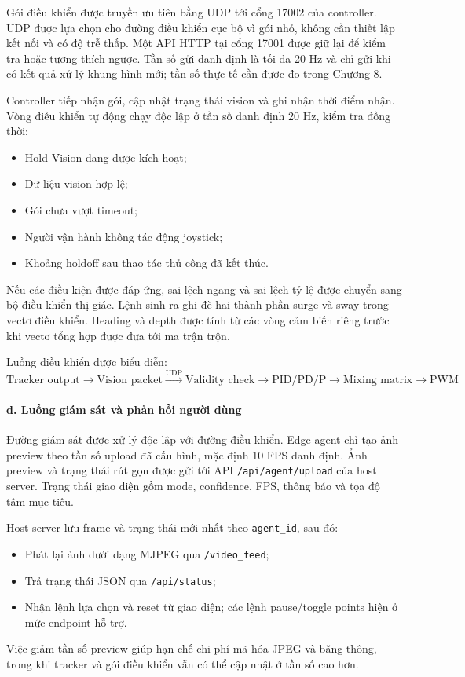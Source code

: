 \documentclass[../DoAn.tex]{subfiles}
\begin{document}
Gói điều khiển được truyền ưu tiên bằng UDP tới cổng 17002 của controller. UDP được lựa chọn cho đường điều khiển cục bộ vì gói nhỏ, không cần thiết lập kết nối và có độ trễ thấp. Một API HTTP tại cổng 17001 được giữ lại để kiểm tra hoặc tương thích ngược. Tần số gửi danh định là tối đa 20 Hz và chỉ gửi khi có kết quả xử lý khung hình mới; tần số thực tế cần được đo trong Chương 8.

Controller tiếp nhận gói, cập nhật trạng thái vision và ghi nhận thời điểm nhận. Vòng điều khiển tự động chạy độc lập ở tần số danh định 20 Hz, kiểm tra đồng thời:
\begin{itemize}
    \item Hold Vision đang được kích hoạt;
    \item Dữ liệu vision hợp lệ;
    \item Gói chưa vượt timeout;
    \item Người vận hành không tác động joystick;
    \item Khoảng holdoff sau thao tác thủ công đã kết thúc.
\end{itemize}

Nếu các điều kiện được đáp ứng, sai lệch ngang và sai lệch tỷ lệ được chuyển sang bộ điều khiển thị giác. Lệnh sinh ra ghi đè hai thành phần surge và sway trong vectơ điều khiển. Heading và depth được tính từ các vòng cảm biến riêng trước khi vectơ tổng hợp được đưa tới ma trận trộn.

Luồng điều khiển được biểu diễn:
\[
\text{Tracker output} \longrightarrow \text{Vision packet} \xrightarrow{\text{UDP}} \text{Validity check} \longrightarrow \text{PID/PD/P} \longrightarrow \text{Mixing matrix} \longrightarrow \text{PWM}
\]

\paragraph{d. Luồng giám sát và phản hồi người dùng}
Đường giám sát được xử lý độc lập với đường điều khiển. Edge agent chỉ tạo ảnh preview theo tần số upload đã cấu hình, mặc định 10 FPS danh định. Ảnh preview và trạng thái rút gọn được gửi tới API \texttt{/api/agent/upload} của host server. Trạng thái giao diện gồm mode, confidence, FPS, thông báo và tọa độ tâm mục tiêu.

Host server lưu frame và trạng thái mới nhất theo \texttt{agent\_id}, sau đó:
\begin{itemize}
    \item Phát lại ảnh dưới dạng MJPEG qua \texttt{/video\_feed};
    \item Trả trạng thái JSON qua \texttt{/api/status};
    \item Nhận lệnh lựa chọn và reset từ giao diện; các lệnh pause/toggle points hiện ở mức endpoint hỗ trợ.
\end{itemize}
Việc giảm tần số preview giúp hạn chế chi phí mã hóa JPEG và băng thông, trong khi tracker và gói điều khiển vẫn có thể cập nhật ở tần số cao hơn.
\end{document}
